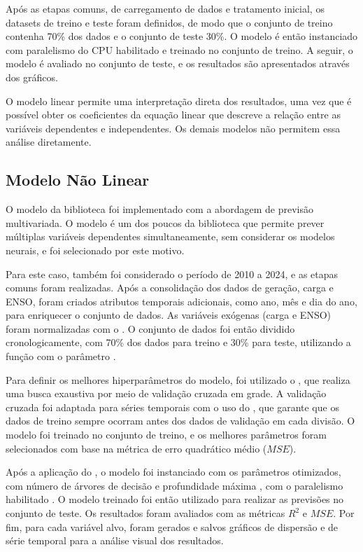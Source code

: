 Após as etapas comuns, de carregamento de dados e tratamento inicial, os datasets de treino e teste foram definidos, de modo que
o conjunto de treino contenha 70\% dos dados e o conjunto de teste 30\%. O modelo é então instanciado com paralelismo do
CPU habilitado e treinado no conjunto de treino. A seguir, o modelo é avaliado no conjunto de teste, e os resultados são
apresentados através dos gráficos.

O modelo linear permite uma interpretação direta dos resultados, uma vez que é possível obter os coeficientes da equação
linear que descreve a relação entre as variáveis dependentes e independentes. Os demais modelos não permitem essa análise diretamente.

\subsection{Modelo Não Linear} %
O modelo  da biblioteca  foi implementado com a abordagem de previsão multivariada.
O modelo é um dos poucos da biblioteca que permite prever múltiplas variáveis dependentes simultaneamente, sem considerar os modelos
neurais, e foi selecionado por este motivo.

Para este caso, também foi considerado o período de 2010 a 2024, e as etapas comuns foram realizadas. Após a consolidação 
dos dados de geração, carga e ENSO, foram criados atributos temporais adicionais, como ano, mês e dia do ano, para enriquecer 
o conjunto de dados. As variáveis exógenas (carga e ENSO) foram normalizadas com o . O conjunto de dados 
foi então dividido cronologicamente, com 70\% dos dados para treino e 30\% para teste, utilizando a função  
com o parâmetro .

Para definir os melhores hiperparâmetros do modelo, foi utilizado o , que realiza uma busca exaustiva por 
meio de validação cruzada em grade. A validação cruzada foi adaptada para séries temporais com o uso do , 
que garante que os dados de treino sempre ocorram antes dos dados de validação em cada divisão. O modelo foi treinado no conjunto 
de treino, e os melhores parâmetros foram selecionados com base na métrica de erro quadrático médio ($MSE$).

Após a aplicação do , o modelo foi instanciado com os parâmetros otimizados, com número de árvores de decisão 
 e profundidade máxima , com o paralelismo habilitado . O modelo 
treinado foi então utilizado para realizar as previsões no conjunto de teste. Os resultados foram avaliados com as métricas $R^2$ e $MSE$. 
Por fim, para cada variável alvo, foram gerados e salvos gráficos de dispersão e de série temporal para a análise visual dos resultados.


